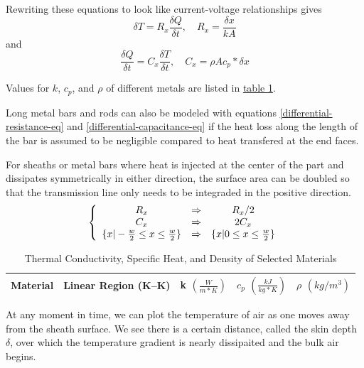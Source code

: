 \documentclass[10pt, twocolumn]{article}
\begin{document}
Rewriting these equations to look like current-voltage relationships gives
\begin{equation}
\delta T=R_{x}\frac{\delta Q}{\delta t},
\quad R_{x}=\frac{\delta x}{kA}
\label{differential-resistance-eq}
\end{equation}
and
\begin{equation}
\frac{\delta Q}{\delta t}=C_{x}\frac{\delta T}{\delta t},
\quad C_{x}=\rho A c_{p} * \delta x
\label{differential-capacitance-eq}
\end{equation}

Values for $k$, $c_{p}$, and $\rho$ of different metals are listed in
\hyperref[thermal-properties-table]{table \ref{thermal-properties-table}}.

Long metal bars and rods can also be modeled with equations
\ref{differential-resistance-eq} and \ref{differential-capacitance-eq}
if the heat loss along the length of the bar is assumed to be
negligible compared to heat transfered at the end faces.

For sheaths or metal bars where heat is injected at the center
of the part and dissipates symmetrically in either direction,
the surface area can be doubled so that the transmission line
only needs to be integraded in the positive direction.
\begin{equation}
\left\{\begin{array}{c c c}
R_{x}	&\Rightarrow	&R_{x}/{2}	\\
C_{x}	&\Rightarrow	&2C_{x}	\\
\{x|-\frac{w}{2} \leq x \leq \frac{w}{2}\}	&\Rightarrow	&\{x|0 \leq x \leq \frac{w}{2}\}	\\
\end{array}\right.
\end{equation}

\begin{table}
\centering
\caption{Thermal Conductivity, Specific Heat, and Density of Selected Materials}
\begin{tabular}{c | c | c | c | c}
\hline\hline
Material	&Linear Region (K--K)	&k \(\left(\frac{W}{m*K}\right)\)	&\(c_{p}\) \(\left(\frac{kJ}{kg*K}\right)\)	&\(\rho\) \((kg/m^{3})\)	\\
\hline\hline

\hline\hline
\end{tabular}
\label{thermal-properties-table}
\end{table}

At any moment in time, we can plot the temperature of air as one
moves away from the sheath surface. We see there is a certain
distance, called the skin depth $\delta$, over which the temperature
gradient is nearly dissipaited and the bulk air begins.
\end{document}
